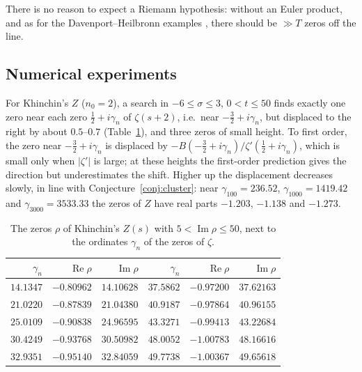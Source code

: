 \documentclass[11pt,reqno]{amsart}
\theoremstyle{definition}
\theoremstyle{remark}
\begin{document}
There is no reason to expect a Riemann hypothesis: without an Euler product, and as for the Davenport--Heilbronn
examples \cite{DH36}, there should be $\gg T$ zeros off the line.

\subsection{Numerical experiments}
For Khinchin's $Z$ ($n_0 = 2$), a search in $-6 \le \sigma \le 3$, $0 < t \le 50$ finds exactly one zero near each
zero $\frac12 + i\gamma_n$ of $\zeta(s+2)$, i.e.\ near $-\frac32 + i\gamma_n$, but displaced to the right by about
$0.5$--$0.7$ (Table~\ref{tab:zeros}), and three zeros of small height. To first order, the zero near
$-\frac32 + i\gamma_n$ is displaced by $-B(-\frac32 + i\gamma_n)/\zeta'(\frac12+i\gamma_n)$, which is small only when
$|\zeta'|$ is large; at these heights the first-order prediction gives the direction but underestimates the shift.
Higher up the displacement decreases slowly, in line with Conjecture~\ref{conj:cluster}: near
$\gamma_{100} = 236.52$, $\gamma_{1000} = 1419.42$ and $\gamma_{3000} = 3533.33$ the zeros of $Z$ have real parts
$-1.203$, $-1.138$ and $-1.273$.

\begin{table}[t]
\centering\small
\caption{The zeros $\rho$ of Khinchin's $Z(s)$ with $5 < \operatorname{Im}\rho \le 50$, next to the ordinates
$\gamma_n$ of the zeros of $\zeta$.}
\label{tab:zeros}
\begin{tabular}{rrr@{\qquad}rrr}
\toprule
$\gamma_n$ & $\operatorname{Re}\rho$ & $\operatorname{Im}\rho$ & $\gamma_n$ & $\operatorname{Re}\rho$ & $\operatorname{Im}\rho$ \\
\midrule
$14.1347$ & $-0.80962$ & $14.10628$ & $37.5862$ & $-0.97200$ & $37.62163$ \\
$21.0220$ & $-0.87839$ & $21.04380$ & $40.9187$ & $-0.97864$ & $40.96155$ \\
$25.0109$ & $-0.90838$ & $24.96595$ & $43.3271$ & $-0.99413$ & $43.22684$ \\
$30.4249$ & $-0.93768$ & $30.50982$ & $48.0052$ & $-1.00783$ & $48.16616$ \\
$32.9351$ & $-0.95140$ & $32.84059$ & $49.7738$ & $-1.00367$ & $49.65618$ \\
\bottomrule
\end{tabular}
\end{table}
\end{document}
